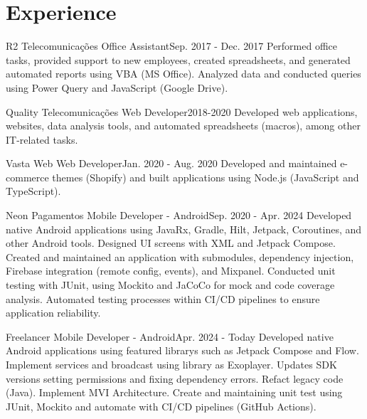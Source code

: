 \section{Experience}
  \resumeSubHeadingListStart

    \resumeSubheading
      {R2 Telecomunicações}{}
      {Office Assistant}{Sep. 2017 - Dec. 2017}
      \resumeItemListStart
          {Performed office tasks, provided support to new employees, created spreadsheets, and generated automated reports using VBA (MS Office). Analyzed data and conducted queries using Power Query and JavaScript (Google Drive).}
      \resumeItemListEnd

    \resumeSubheading
      {Quality Telecomunicações}{}
      {Web Developer}{2018-2020}
      \resumeItemListStart
          {Developed web applications, websites, data analysis tools, and automated spreadsheets (macros), among other IT-related tasks.}
      \resumeItemListEnd

    \resumeSubheading
      {Vasta Web}{}
      {Web Developer}{Jan. 2020 - Aug. 2020}
      \resumeItemListStart
          {Developed and maintained e-commerce themes (Shopify) and built applications using Node.js (JavaScript and TypeScript).}
      \resumeItemListEnd

    \resumeSubheading
      {Neon Pagamentos}{}
      {Mobile Developer - Android}{Sep. 2020 - Apr. 2024}
      \resumeItemListStart
          {Developed native Android applications using JavaRx, Gradle, Hilt, Jetpack, Coroutines, and other Android tools. Designed UI screens with XML and Jetpack Compose. Created and maintained an application with submodules, dependency injection, Firebase integration (remote config, events), and Mixpanel.}
          {Conducted unit testing with JUnit, using Mockito and JaCoCo for mock and code coverage analysis. Automated testing processes within CI/CD pipelines to ensure application reliability.}
      \resumeItemListEnd

    \resumeSubheading
      {Freelancer}{}
      {Mobile Developer - Android}{Apr. 2024 - Today}
      \resumeItemListStart
          {Developed native Android applications using featured librarys such as Jetpack Compose and Flow. Implement services and broadcast using library as Exoplayer. Updates SDK versions setting permissions and fixing dependency errors. Refact legacy code (Java). Implement MVI Architecture. Create and maintaining unit test using JUnit, Mockito and automate with CI/CD pipelines (GitHub Actions).}
      \resumeItemListEnd

  \resumeSubHeadingListEnd
